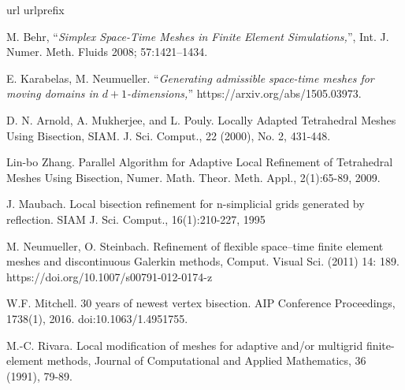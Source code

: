 \documentclass[a4paper,12pt]{amsart}
\numberwithin{equation}{section}
\begin{document}
\begin{thebibliography}{99}
\expandafter\ifx\csname url\endcsname\relax
  \def\url#1{\texttt{#1}}\fi
\expandafter\ifx\csname urlprefix\endcsname\relax\def\urlprefix{URL }\fi

M. Behr, ``{\em Simplex Space-Time Meshes in Finite Element Simulations,}'',
Int. J. Numer. Meth. Fluids 2008; 57:1421–1434.

E. Karabelas, M. Neumueller. 
``{\em Generating admissible space-time meshes for moving domains in $d + 1$-dimensions,}''
https://arxiv.org/abs/1505.03973.

D. N. Arnold, A. Mukherjee, and L. Pouly. Locally Adapted Tetrahedral Meshes Using Bisection, SIAM. J. Sci. Comput., 22 (2000), No. 2, 431-448.

Lin-bo Zhang. Parallel Algorithm for Adaptive Local Refinement
of Tetrahedral Meshes Using Bisection, Numer. Math. Theor. Meth. Appl., 2(1):65-89, 2009.

J. Maubach. Local bisection refinement for n-simplicial grids generated by reflection. SIAM J. Sci. Comput., 16(1):210-227, 1995

M. Neumueller, O. Steinbach. Refinement of flexible space–time finite element meshes and discontinuous Galerkin methods, Comput. Visual Sci. (2011) 14: 189. https://doi.org/10.1007/s00791-012-0174-z

W.F. Mitchell. 30 years of newest vertex bisection. AIP Conference Proceedings, 1738(1), 2016. doi:10.1063/1.4951755.

M.-C. Rivara. Local modification of meshes for adaptive and/or 
multigrid finite-element methods, Journal of Computational and  Applied Mathematics, 36 (1991), 79-89.


\end{thebibliography}
\end{document}
